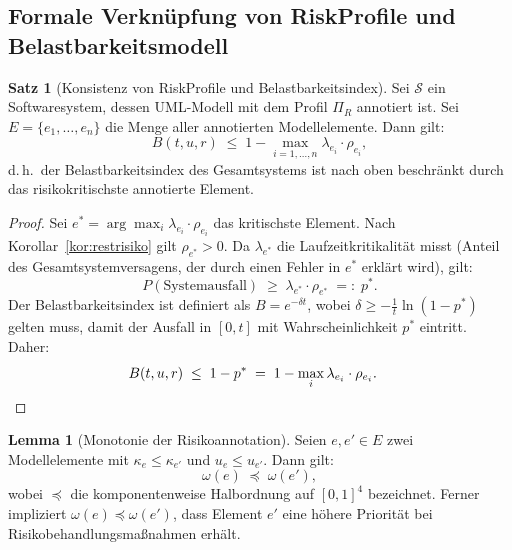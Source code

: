 ﻿\documentclass[a4paper,12pt]{article}
\theoremstyle{definition}
\newtheorem{satz}{Satz}
\newtheorem{lemma}{Lemma}
\newenvironment{beweis}{\begin{proof}}{\end{proof}}
\begin{document}
\subsection{Formale Verkn\"upfung von \textsf{RiskProfile} und\\Belastbarkeitsmodell}

\begin{satz}[Konsistenz von \textsf{RiskProfile} und Belastbarkeitsindex]
\label{satz:uml-konsistenz}
    Sei $\mathcal{S}$ ein Softwaresystem, dessen UML-Modell mit dem Profil
    $\Pi_R$ annotiert ist. Sei $E = \{e_1, \ldots, e_n\}$ die Menge aller
    annotierten Modellelemente. Dann gilt:
    \[
        B(t, u, r) \;\leq\; 1 - \max_{i=1,\ldots,n} \lambda_{e_i} \cdot \rho_{e_i},
    \]
    d.\,h.\ der Belastbarkeitsindex des Gesamtsystems ist nach oben beschr\"ankt
    durch das risikokritischste annotierte Element.
\end{satz}

\begin{beweis}
    Sei $e^* = \arg\max_i \lambda_{e_i} \cdot \rho_{e_i}$ das kritischste Element.
    Nach Korollar~\ref{kor:restrisiko} gilt $\rho_{e^*} > 0$. Da $\lambda_{e^*}$
    die Laufzeitkritikalit\"at misst (Anteil des Gesamtsystemversagens, der durch
    einen Fehler in $e^*$ erkl\"art wird), gilt:
    \[
        P(\text{Systemausfall}) \;\geq\; \lambda_{e^*} \cdot \rho_{e^*} \;=:\; p^*.
    \]
    Der Belastbarkeitsindex ist definiert als $B = e^{-\delta t}$, wobei
    $\delta \geq -\frac{1}{t}\ln(1 - p^*)$ gelten muss, damit der Ausfall in
    $[0,t]$ mit Wahrscheinlichkeit $p^*$ eintritt. Daher:
    \[
        B(t,u,r) \;\leq\; 1 - p^* \;=\; 1 - \max_i \lambda_{e_i} \cdot \rho_{e_i}.
        \quad\qedhere
    \]
\end{beweis}

\begin{lemma}[Monotonie der Risikoannotation]
\label{satz:uml-monoton}
    Seien $e, e' \in E$ zwei Modellelemente mit $\kappa_e \leq \kappa_{e'}$ und
    $u_e \leq u_{e'}$. Dann gilt:
    \[
        \omega(e) \;\preceq\; \omega(e'),
    \]
    wobei $\preceq$ die komponentenweise Halbordnung auf $[0,1]^4$ bezeichnet.
    Ferner impliziert $\omega(e) \preceq \omega(e')$, dass Element $e'$ eine
    h\"ohere Priorit\"at bei Risikobehandlungsma\ss{}nahmen erh\"alt.
\end{lemma}
\end{document}
